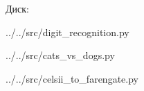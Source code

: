 Диск:

\hspace{0pt}
\newpage


{../../src/digit_recognition.py}

\newpage


{../../src/cats_vs_dogs.py}

\newpage


{../../src/celsii_to_farengate.py}